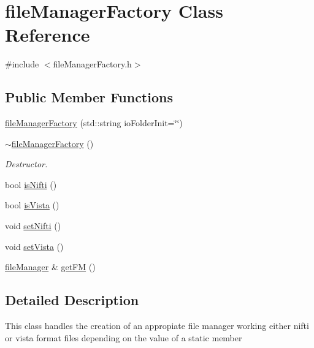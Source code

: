 \hypertarget{classfileManagerFactory}{\section{file\-Manager\-Factory \-Class \-Reference}
\label{classfileManagerFactory}
}


{\ttfamily \#include $<$file\-Manager\-Factory.\-h$>$}

\subsection*{\-Public \-Member \-Functions}
\begin{DoxyCompactItemize}
\item 
\hyperlink{classfileManagerFactory_a14d4febc2f4a2d1db1218c7fc4d8b3f9}{file\-Manager\-Factory} (std\-::string io\-Folder\-Init=\char`\"{}\char`\"{})
\item 
\hypertarget{classfileManagerFactory_acf969eacd4d8adf629ba3e0055478790}{\hyperlink{classfileManagerFactory_acf969eacd4d8adf629ba3e0055478790}{$\sim$file\-Manager\-Factory} ()}\label{classfileManagerFactory_acf969eacd4d8adf629ba3e0055478790}

\begin{DoxyCompactList}\small\item\em \-Destructor. \end{DoxyCompactList}\item 
bool \hyperlink{classfileManagerFactory_ac7819d6a53543b5db71f57776de0de01}{is\-Nifti} ()
\item 
bool \hyperlink{classfileManagerFactory_aa69e217f378ea58bf94d6fd63d295bc4}{is\-Vista} ()
\item 
void \hyperlink{classfileManagerFactory_a403da3ae30c3608b97acca7c75259a6e}{set\-Nifti} ()
\item 
void \hyperlink{classfileManagerFactory_a6190412b0d6a2844d91d7f5b3378b39a}{set\-Vista} ()
\item 
\hyperlink{classfileManager}{file\-Manager} \& \hyperlink{classfileManagerFactory_a4e1d8cad8d6ccad5ac2ffbaa3ace5ac3}{get\-F\-M} ()
\end{DoxyCompactItemize}


\subsection{\-Detailed \-Description}
\-This class handles the creation of an appropiate file manager working either nifti or vista format files depending on the value of a static member 

